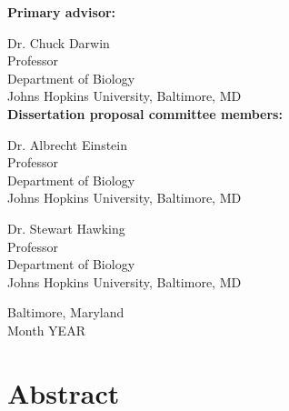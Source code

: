 \vspace{0.75in}
\begin{singlespace}

    \textbf{Primary advisor:}
    
    Dr. Chuck Darwin \\
    Professor \\
    Department of Biology \\
    Johns Hopkins University, Baltimore, MD \\

    \textbf{Dissertation proposal committee members:} 
    
    Dr. Albrecht Einstein \\
    Professor\\
    Department of Biology \\
    Johns Hopkins University, Baltimore, MD
    
    Dr. Stewart Hawking \\
    Professor\\
    Department of Biology \\
    Johns Hopkins University, Baltimore, MD 
    
\end{singlespace}

\vspace{0.75in}
\begin{center}
    Baltimore, Maryland \\  %
    Month YEAR              %
\end{center}






\newpage
{}
\setcounter{page}{2}
\singlespacing                                  %
\section*{Abstract}

\blindtext




